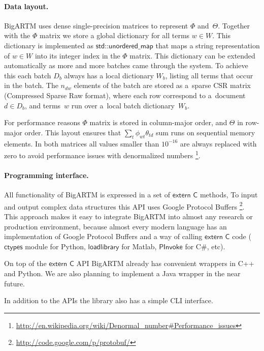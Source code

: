 \documentclass[russian]{llncs}
\newcommand{\kw}[1]{\textsf{#1}}
\begin{document}
\paragraph{Data layout.}
BigARTM uses dense single-precision matrices to represent $\Phi$ and~$\Theta$.
Together with the $\Phi$ matrix we store a global dictionary for all terms ${w \in W}$.
This dictionary is implemented as $\kw{std::unordered\_map}$ that maps a string representation of ${w \in W}$
into its integer index in the $\Phi$ matrix.
This dictionary can be extended automatically as more and more batches came through the system.
To achieve this each batch $D_b$ always has a local dictionary $W_b$, listing all terms that occur in the batch.
The $n_{dw}$ elements of the batch are stored as a~sparse CSR matrix (Compressed Sparse Raw format),
where each row correspond to a~document ${d \in D_b}$,
and terms~$w$ run over a~local batch dictionary~$W_b$.

For performance reasons $\Phi$ matrix is stored in column-major order, and $\Theta$ in row-major order.
This layout ensures that $\sum_t \phi_{wt} \theta_{td}$ sum runs on sequential memory elements.
In both matrices all values smaller than $10^{-16}$ are always replaced with zero to avoid performance issues with denormalized numbers%
\footnote{\url{http://en.wikipedia.org/wiki/Denormal_number#Performance_issues}}.

\paragraph{Programming interface.}
All functionality of BigARTM is expressed in a set of $\kw{extern C}$ methods,
To input and output complex data structures this API uses Google Protocol Buffers%
\footnote{\url{http://code.google.com/p/protobuf/}}.
This approach makes it easy to integrate BigARTM into almost any research or production environment,
because almost every modern language has an implementation of Google Protocol Buffers
and a way of calling $\kw{extern C}$ code
($\kw{ctypes}$ module for Python, $\kw{loadlibrary}$ for Matlab, $\kw{PInvoke}$ for C\#, etc).

On top of the $\kw{extern C}$ API BigARTM already has convenient wrappers in C++ and Python.
We are also planning to implement a Java wrapper in the near future.

In addition to the APIs the library also has a simple CLI interface.
\end{document}
